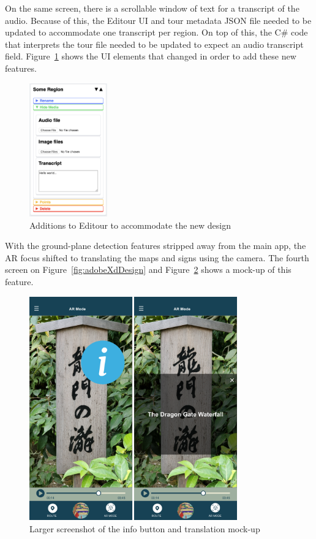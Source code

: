 \documentclass[a4paper, 10pt, american, titlepage]{article}
\begin{document}
On the same screen, there is a scrollable window of text for a transcript of
the audio. Because of this, the Editour UI and tour metadata JSON file needed
to be updated to accommodate one transcript per region. On top of this, the C\#
code that interprets the tour file needed to be updated to expect an audio
transcript field.  Figure~\ref{fig:editourAdditions} shows the UI elements that
changed in order to add these new features.

\begin{figure}[p]
	\centering
	\includegraphics[width=0.3\textwidth]{editour-additions.png}
	\caption{Additions to Editour to accommodate the new design}
	\label{fig:editourAdditions}
\end{figure}

With the ground-plane detection features stripped away from the main app, the AR
focus shifted to translating the maps and signs using the camera. The fourth
screen on Figure~\ref{fig:adobeXdDesign} and
Figure~\ref{fig:infoTranslationZoomed} shows a mock-up of this feature.

\begin{figure}[p] \centering
    \includegraphics[width=0.8\textwidth]{info-translation-zoomed.png}
    \caption{Larger screenshot of the info button and translation mock-up}
    \label{fig:infoTranslationZoomed}
\end{figure}
\end{document}
